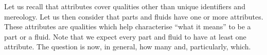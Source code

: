 \label{pama:taf}\pos{\normalsize}{\HHHH}

\begynd
\pind Let us recall that attributes cover qualities \nyl other than
      unique identifiers and mereology.
\pind Let us then consider that parts and fluids \nyl \ysfchg{} have one or more attributes.
\begynd
\pind These attributes are qualities
\pind which help characterise ``what it means'' \nyl to be a part or a fluid.
\afslut 
\pind Note that we expect every part and fluid to have at least one attribute.
\pind The question is now, in general, \nyl how many and, particularly, which.
\afslut


\mnewfoil\HHHH

